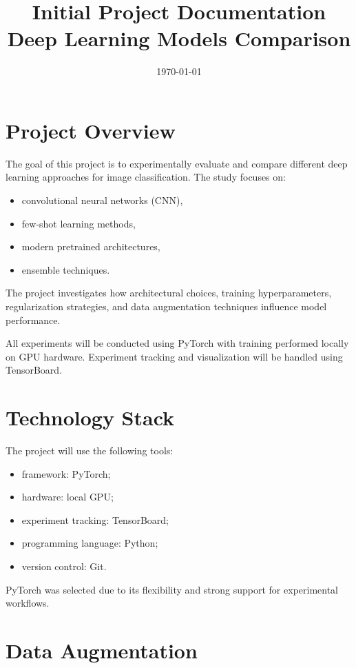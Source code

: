 \documentclass[11pt,a4paper]{article}
\title{Initial Project Documentation\\
Deep Learning Models Comparison}
\author{}
\date{\today}
\begin{document}
\maketitle

\section{Project Overview}

The goal of this project is to experimentally evaluate and compare different deep learning approaches for image classification. The study focuses on:

\begin{itemize}
    \item convolutional neural networks (CNN),
    \item few-shot learning methods,
    \item modern pretrained architectures,
    \item ensemble techniques.
\end{itemize}

The project investigates how architectural choices, training hyperparameters, regularization strategies, and data augmentation techniques influence model performance.

All experiments will be conducted using PyTorch with training performed locally on GPU hardware. Experiment tracking and visualization will be handled using TensorBoard.

\section{Technology Stack}

The project will use the following tools:

\begin{itemize}
    \item framework: PyTorch;
    \item hardware: local GPU;
    \item experiment tracking: TensorBoard;
    \item programming language: Python;
    \item version control: Git.
\end{itemize}

PyTorch was selected due to its flexibility and strong support for experimental workflows.

\section{Data Augmentation}
\end{document}
